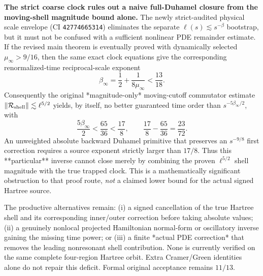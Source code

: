 \documentclass[11pt]{amsart}
\begin{document}
\medskip
\noindent\textbf{The strict coarse clock rules out a naive full-Duhamel
closure from the moving-shell magnitude bound alone.}
The newly strict-audited physical scale envelope (CI
\texttt{42774665314}) eliminates the separate
\(\ell(s)\lesssim s^{-\beta}\) bootstrap, but it must not
be confused with a sufficient nonlinear PDE remainder
estimate. If the revised main theorem is eventually proved
with dynamically selected \(\mu_\infty>9/16\), then
the same exact clock equations give the corresponding
renormalized-time reciprocal-scale exponent
\[
 \beta_\infty=\frac12+\frac1{8\mu_\infty}
 <\frac{13}{18}.
\]
Consequently the original *magnitude-only* moving-cutoff
commutator estimate
\(\|\mathcal R_{\rm shell}\|\lesssim\ell^{5/2}\)
yields, by itself, no better guaranteed time order than
\(s^{-5\beta_\infty/2}\), with
\[
 \frac{5\beta_\infty}{2}
 <\frac{65}{36}
 <\frac{17}{8},\qquad
 \frac{17}{8}-\frac{65}{36}=\frac{23}{72}.
\]
An unweighted absolute backward Duhamel primitive that
preserves an \(s^{-9/8}\) first correction requires a
source exponent strictly larger than \(17/8\).
Thus this **particular** inverse cannot close merely by
combining the proven \(\ell^{5/2}\) shell magnitude
with the true trapped clock. This is a
mathematically significant obstruction to that
proof route, \emph{not} a claimed lower bound for
the actual signed Hartree source.

The productive alternatives remain:
(i) a signed cancellation of the true Hartree shell
and its corresponding inner/outer correction before taking
absolute values;
(ii) a genuinely nonlocal projected Hamiltonian
normal-form or oscillatory inverse gaining the missing
time power; or
(iii) a finite *actual PDE correction* that removes the
leading nonresonant shell contribution.
None is currently verified on the same complete
four-region Hartree orbit. Extra Cramer/Green identities
alone do not repair this deficit. Formal original acceptance
remains \(11/13\).
\end{document}
